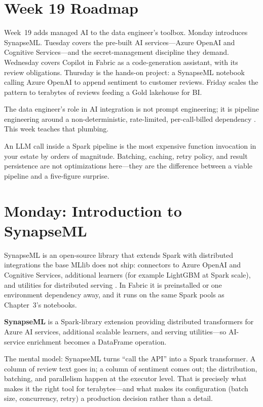 \section{Week 19 Roadmap}
Week~19 adds managed AI to the data engineer's toolbox. Monday introduces SynapseML. Tuesday covers the pre-built AI services---Azure OpenAI and Cognitive Services---and the secret-management discipline they demand. Wednesday covers Copilot in Fabric as a code-generation assistant, with its review obligations. Thursday is the hands-on project: a SynapseML notebook calling Azure OpenAI to append sentiment to customer reviews. Friday scales the pattern to terabytes of reviews feeding a Gold lakehouse for BI.

The data engineer's role in AI integration is not prompt engineering; it is pipeline engineering around a non-deterministic, rate-limited, per-call-billed dependency \cite{synapseML,microsoftFabricAiServices}. This week teaches that plumbing.

\begin{notebox}
An LLM call inside a Spark pipeline is the most expensive function invocation in your estate by orders of magnitude. Batching, caching, retry policy, and result persistence are not optimizations here---they are the difference between a viable pipeline and a five-figure surprise.
\end{notebox}

\section{Monday: Introduction to SynapseML}
SynapseML is an open-source library that extends Spark with distributed integrations the base MLlib does not ship: connectors to Azure OpenAI and Cognitive Services, additional learners (for example LightGBM at Spark scale), and utilities for distributed serving \cite{synapseML}. In Fabric it is preinstalled or one environment dependency away, and it runs on the same Spark pools as Chapter~3's notebooks.

\begin{definitionbox}
\textbf{SynapseML} is a Spark-library extension providing distributed transformers for Azure AI services, additional scalable learners, and serving utilities---so AI-service enrichment becomes a DataFrame operation.
\end{definitionbox}

The mental model: SynapseML turns ``call the API'' into a Spark transformer. A column of review text goes in; a column of sentiment comes out; the distribution, batching, and parallelism happen at the executor level. That is precisely what makes it the right tool for terabytes---and what makes its configuration (batch size, concurrency, retry) a production decision rather than a detail.

